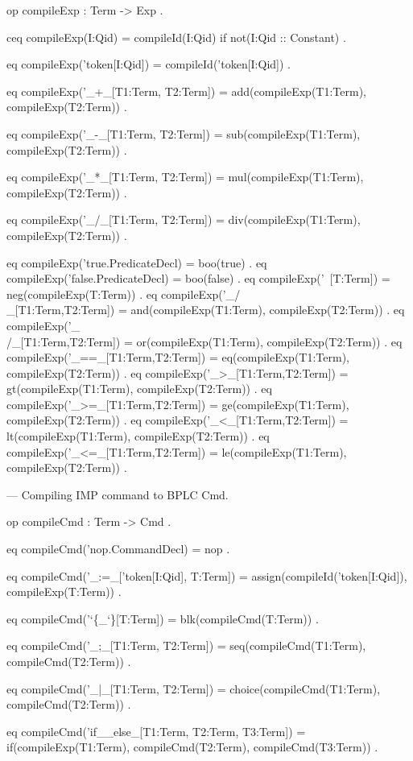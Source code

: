 \documentclass{llncs}%
\begin{document}
    op compileExp : Term -> Exp .

    ceq compileExp(I:Qid) = compileId(I:Qid) if not(I:Qid :: Constant) .

    eq compileExp('token[I:Qid]) = compileId('token[I:Qid]) .

    eq compileExp('_+_[T1:Term, T2:Term]) =
       add(compileExp(T1:Term), compileExp(T2:Term)) .

    eq compileExp('_-_[T1:Term, T2:Term]) =
       sub(compileExp(T1:Term), compileExp(T2:Term)) .

    eq compileExp('_*_[T1:Term, T2:Term]) =
       mul(compileExp(T1:Term), compileExp(T2:Term)) .

    eq compileExp('_/_[T1:Term, T2:Term]) =
       div(compileExp(T1:Term), compileExp(T2:Term)) .

    eq compileExp('true.PredicateDecl) = boo(true) .
    eq compileExp('false.PredicateDecl) = boo(false) .
    eq compileExp('~[T:Term]) = neg(compileExp(T:Term)) .
    eq compileExp('_/\\_[T1:Term,T2:Term]) = and(compileExp(T1:Term), compileExp(T2:Term)) .
    eq compileExp('_\\/_[T1:Term,T2:Term]) = or(compileExp(T1:Term), compileExp(T2:Term)) .
    eq compileExp('_==_[T1:Term,T2:Term]) = eq(compileExp(T1:Term), compileExp(T2:Term)) .
    eq compileExp('_>_[T1:Term,T2:Term]) = gt(compileExp(T1:Term), compileExp(T2:Term)) .
    eq compileExp('_>=_[T1:Term,T2:Term]) = ge(compileExp(T1:Term), compileExp(T2:Term)) .
    eq compileExp('_<_[T1:Term,T2:Term]) = lt(compileExp(T1:Term), compileExp(T2:Term)) .
    eq compileExp('_<=_[T1:Term,T2:Term]) = le(compileExp(T1:Term), compileExp(T2:Term)) .

        --- Compiling IMP command to BPLC Cmd.

    op compileCmd : Term -> Cmd .

    eq compileCmd('nop.CommandDecl) = nop .

    eq compileCmd('_:=_['token[I:Qid], T:Term]) =
           assign(compileId('token[I:Qid]), compileExp(T:Term)) .

    eq compileCmd('`\{_`\}[T:Term]) = blk(compileCmd(T:Term)) .

    eq compileCmd('_;_[T1:Term, T2:Term]) =
           seq(compileCmd(T1:Term), compileCmd(T2:Term)) .

    eq compileCmd('_|_[T1:Term, T2:Term]) =
           choice(compileCmd(T1:Term), compileCmd(T2:Term)) .

    eq compileCmd('if__else_[T1:Term, T2:Term, T3:Term]) =
           if(compileExp(T1:Term), compileCmd(T2:Term), compileCmd(T3:Term)) .
\end{document}
